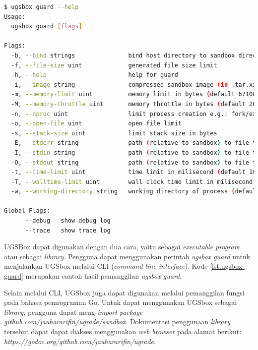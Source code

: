 \begin{lstlisting}[caption={Contoh Hasil Eksekusi Perintah \textit{ugsbox guard}},label={lst:ugsbox-guard},language=Bash,style=BashStyle]
$ ugsbox guard --help
Usage:
  ugsbox guard [flags]

Flags:
  -b, --bind strings               bind host directory to sandbox directory with format <hostdir>:<sandboxdir>. Warning: file owner of binded directory will be changed
  -f, --file-size uint             generated file size limit
  -h, --help                       help for guard
  -i, --image string               compressed sandbox image (in .tar.xz) path
  -m, --memory-limit uint          memory limit in bytes (default 67108864)
  -M, --memory-throttle uint       memory throttle in bytes (default 268435456)
  -n, --nproc uint                 limit process creation e.g.: fork/exec
  -o, --open-file uint             open file limit
  -s, --stack-size uint            limit stack size in bytes
  -E, --stderr string              path (relative to sandbox) to file to be used as stderr
  -I, --stdin string               path (relative to sandbox) to file to be used as stdin
  -O, --stdout string              path (relative to sandbox) to file to be used as stdout
  -t, --time-limit uint            time limit in milisecond (default 10000)
  -T, --walltime-limit uint        wall clock time limit in milisecond (default 10000)
  -w, --working-directory string   working directory of process (default "/home")

Global Flags:
      --debug   show debug log
      --trace   show trace log
\end{lstlisting}

\par UGSBox dapat digunakan dengan dua cara, yaitu sebagai \textit{executable program} atau sebagai \textit{library}. Pengguna dapat menggunakan perintah \textit{ugsbox guard} untuk menjalankan UGSbox melalui CLI (\textit{command line interface}). Kode \ref{lst:ugsbox-guard} merupakan contoh hasil pemanggilan \textit{ugsbox guard}.

\par Selain melalui CLI, UGSbox juga dapat digunakan melalui pemanggilan fungsi pada bahasa pemrograman Go. Untuk dapat menggunakan UGSbox sebagai \textit{library}, pengguna dapat meng-\textit{import} \textit{package github.com/jauhararifin/ugrade/sandbox}. Dokumentasi penggunaan \textit{library} tersebut dapat dapat diakses menggunakan \textit{web browser} pada alamat berikut: \textit{https://godoc.org/github.com/jauhararifin/ugrade}.

